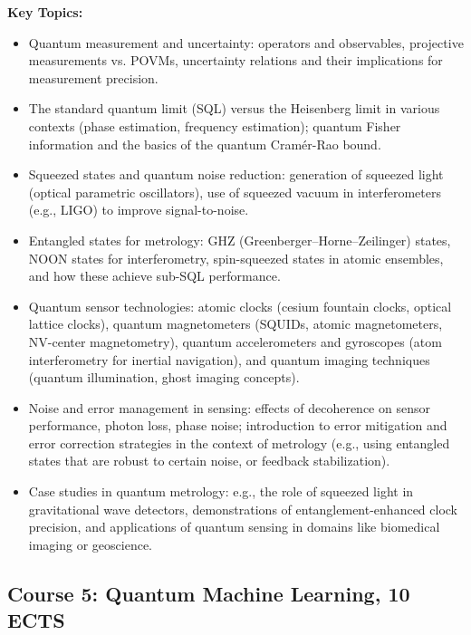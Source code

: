 \documentclass{scrreprt}
\begin{document}
\textbf{Key Topics:}
\begin{itemize}
\item Quantum measurement and uncertainty: operators and observables, projective measurements vs. POVMs, uncertainty relations and their implications for measurement precision.
\item The standard quantum limit (SQL) versus the Heisenberg limit in various contexts (phase estimation, frequency estimation); quantum Fisher information and the basics of the quantum Cramér-Rao bound.
\item Squeezed states and quantum noise reduction: generation of squeezed light (optical parametric oscillators), use of squeezed vacuum in interferometers (e.g., LIGO) to improve signal-to-noise.
\item Entangled states for metrology: GHZ (Greenberger–Horne–Zeilinger) states, NOON states for interferometry, spin-squeezed states in atomic ensembles, and how these achieve sub-SQL performance.
\item Quantum sensor technologies: atomic clocks (cesium fountain clocks, optical lattice clocks), quantum magnetometers (SQUIDs, atomic magnetometers, NV-center magnetometry), quantum accelerometers and gyroscopes (atom interferometry for inertial navigation), and quantum imaging techniques (quantum illumination, ghost imaging concepts).
\item Noise and error management in sensing: effects of decoherence on sensor performance, photon loss, phase noise; introduction to error mitigation and error correction strategies in the context of metrology (e.g., using entangled states that are robust to certain noise, or feedback stabilization).
\item Case studies in quantum metrology: e.g., the role of squeezed light in gravitational wave detectors, demonstrations of entanglement-enhanced clock precision, and applications of quantum sensing in domains like biomedical imaging or geoscience.
\end{itemize}

\subsection{Course 5: Quantum Machine Learning, 10 ECTS}
\end{document}
